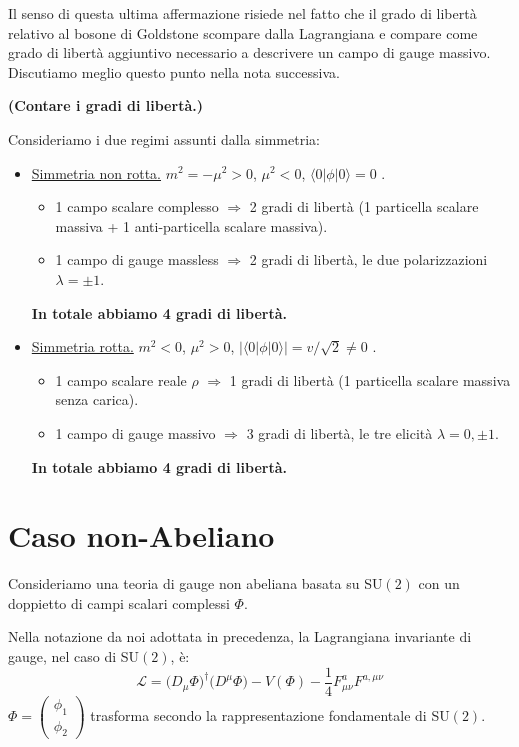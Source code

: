 \documentclass[../main.tex]{subfiles}
\begin{document}
Il senso di questa ultima affermazione risiede nel fatto che il grado di libertà relativo al bosone di Goldstone scompare dalla Lagrangiana e compare come grado di libertà aggiuntivo necessario a descrivere un campo di gauge massivo. Discutiamo meglio questo punto nella nota successiva.

\begin{nota}
    \textbf{(Contare i gradi di libertà.)}

    Consideriamo i due regimi assunti dalla simmetria:
    \begin{itemize}
        \item \underline{Simmetria non rotta.} $m^2=-\mu^2>0$, $\mu^2<0$, $\langle0|\phi|0\rangle =0$ .
        \begin{itemize}
            \item 1 campo scalare complesso $\Rightarrow$ 2 gradi di libertà (1 particella scalare massiva + 1 anti-particella scalare massiva).
            \item 1 campo di gauge massless $\Rightarrow$ 2 gradi di libertà, le due polarizzazioni $\lambda=\pm1$.
        \end{itemize}
        \textbf{In totale abbiamo 4 gradi di libertà.}
        
        \item \underline{Simmetria rotta.} $m^2<0$, $\mu^2>0$, $|\langle0|\phi|0\rangle| = v/\sqrt2\neq0$ .
        \begin{itemize}
            \item 1 campo scalare reale $\rho$ $\Rightarrow$ 1 gradi di libertà (1 particella scalare massiva senza carica).
            \item 1 campo di gauge massivo $\Rightarrow$ 3 gradi di libertà, le tre elicità $\lambda=0,\pm1$.
        \end{itemize}
        \textbf{In totale abbiamo 4 gradi di libertà.}
    \end{itemize}
\end{nota}

\section{Caso non-Abeliano}
Consideriamo una teoria di gauge non abeliana basata su SU$(2)$ con un doppietto di campi scalari complessi $\Phi$.

Nella notazione da noi adottata in precedenza, la Lagrangiana invariante di gauge, nel caso di SU$(2)$, è:
\begin{equation}
    \boxed{\mathscr{L} = \big(D_\mu\Phi\big)^\dagger\big(D^\mu\Phi\big) - V(\Phi) - \frac{1}{4}F_{\mu\nu}^aF^{a,\mu\nu}}
    \label{eq:SU2_gauge_invariant_lagrangian}
\end{equation}
$\Phi = \begin{pmatrix} \phi_1 \\ \phi_2 \end{pmatrix}$ trasforma secondo la rappresentazione fondamentale di SU$(2)$.
\end{document}
